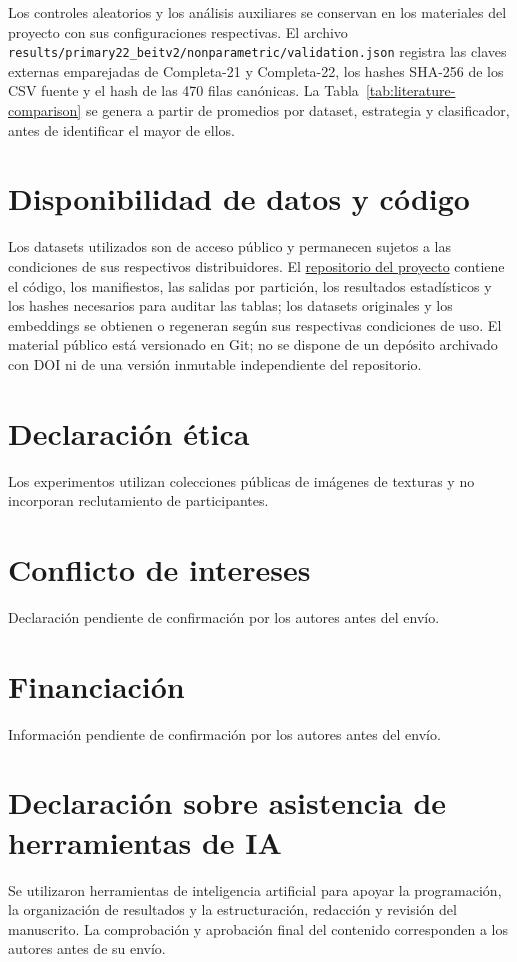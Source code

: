 \documentclass[a4paper,fleqn]{cas-sc}
\begin{document}
Los controles aleatorios y los análisis auxiliares se conservan en los materiales del proyecto con sus configuraciones respectivas. El archivo \texttt{results/primary22\_beitv2/nonparametric/validation.json} registra las claves externas emparejadas de Completa-21 y Completa-22, los hashes SHA-256 de los CSV fuente y el hash de las 470 filas canónicas. La Tabla~\ref{tab:literature-comparison} se genera a partir de promedios por dataset, estrategia y clasificador, antes de identificar el mayor de ellos.

\section*{Disponibilidad de datos y código}
Los datasets utilizados son de acceso público y permanecen sujetos a las condiciones de sus respectivos distribuidores. El \href{https://github.com/Joafp/concatenacion-descriptores-texturas}{repositorio del proyecto} contiene el código, los manifiestos, las salidas por partición, los resultados estadísticos y los hashes necesarios para auditar las tablas; los datasets originales y los embeddings se obtienen o regeneran según sus respectivas condiciones de uso. El material público está versionado en Git; no se dispone de un depósito archivado con DOI ni de una versión inmutable independiente del repositorio.

\section*{Declaración ética}
Los experimentos utilizan colecciones públicas de imágenes de texturas y no incorporan reclutamiento de participantes.

\section*{Conflicto de intereses}
Declaración pendiente de confirmación por los autores antes del envío.

\section*{Financiación}
Información pendiente de confirmación por los autores antes del envío.

\section*{Declaración sobre asistencia de herramientas de IA}
Se utilizaron herramientas de inteligencia artificial para apoyar la programación, la organización de resultados y la estructuración, redacción y revisión del manuscrito. La comprobación y aprobación final del contenido corresponden a los autores antes de su envío.

\printcredits



\end{document}
